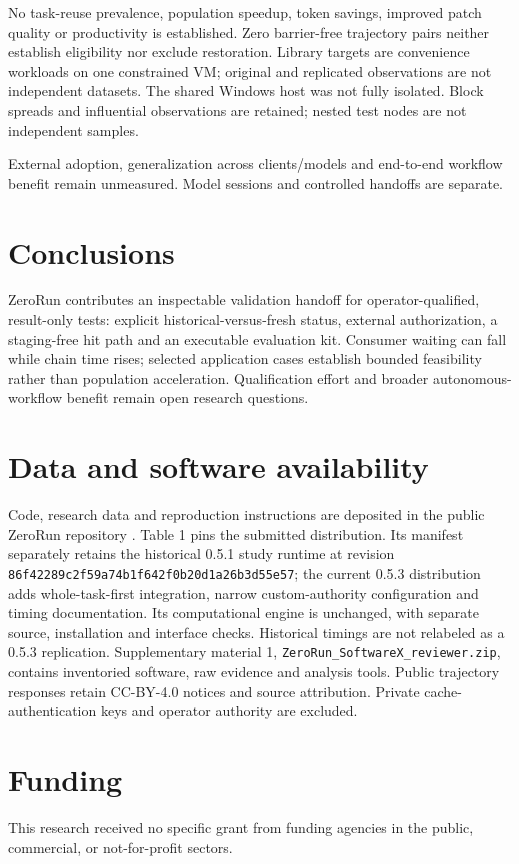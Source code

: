 \documentclass[preprint,12pt,a4paper]{elsarticle}
\newcommand{\code}[1]{\texttt{#1}}
\begin{document}
No task-reuse prevalence, population speedup, token savings, improved patch quality or productivity is established. Zero barrier-free trajectory pairs neither establish eligibility nor exclude restoration. Library targets are convenience workloads on one constrained VM; original and replicated observations are not independent datasets. The shared Windows host was not fully isolated. Block spreads and influential observations are retained; nested test nodes are not independent samples.

External adoption, generalization across clients/models and end-to-end workflow benefit remain unmeasured. Model sessions and controlled handoffs are separate.

\section{Conclusions}
ZeroRun contributes an inspectable validation handoff for operator-qualified, result-only tests: explicit historical-versus-fresh status, external authorization, a staging-free hit path and an executable evaluation kit. Consumer waiting can fall while chain time rises; selected application cases establish bounded feasibility rather than population acceleration. Qualification effort and broader autonomous-workflow benefit remain open research questions.

\section*{Data and software availability}
Code, research data and reproduction instructions are deposited in the public ZeroRun repository \cite{kapoor2026zerorunartifact}. Table 1 pins the submitted distribution. Its manifest separately retains the historical 0.5.1 study runtime at revision \code{86f42289c2f59a74b1f642f0b20d1a26b3d55e57}; the current 0.5.3 distribution adds whole-task-first integration, narrow custom-authority configuration and timing documentation. Its computational engine is unchanged, with separate source, installation and interface checks. Historical timings are not relabeled as a 0.5.3 replication. Supplementary material 1, \code{ZeroRun\_SoftwareX\_reviewer.zip}, contains inventoried software, raw evidence and analysis tools. Public trajectory responses retain CC-BY-4.0 notices and source attribution. Private cache-authentication keys and operator authority are excluded.

\section*{Funding}
This research received no specific grant from funding agencies in the public, commercial, or not-for-profit sectors.
\end{document}
